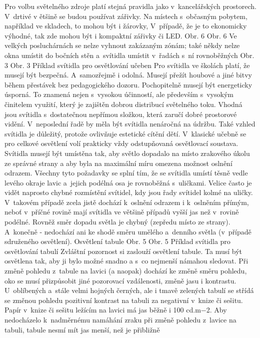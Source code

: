 Pro volbu světelného zdroje platí stejná pravidla jako v~kancelářských prostorech. V~drtivé v
ětšině se budou používat zářivky. Na místech s~občasným pobytem, například ve skladech, to mohou být
i žárovky, V~případě, že je to ekonomicky výhodné, tak zde mohou být i kompaktní zářivky či LED.
Obr. 6
Obr. 6 Ve velkých posluchárnách se nelze vyhnout zakázaným zónám; také někdy nelze okna umístit
do bočních stěn a~svítidla umístit v~řadách s~ní rovnoběžných
Obr. 3
Obr. 3 Příklad svítidla pro osvětlování učeben
\medskip
Pro svítidla ve školách platí, že musejí být bezpečná. A~samozřejmě i odolná. Musejí přežít houbové
a jiné bitvy během přestávek bez pedagogického dozoru. Pochopitelně musejí být energeticky úsporná.
To znamená nejen s~vysokou účinností, ale především s~vysokým činitelem využití, který je zajištěn
dobrou distribucí světelného toku. Vhodná jsou svítidla s~dostatečnou nepřímou složkou, která zaručí
dobré prostorové vidění. V~neposlední řadě by měla být svítidla nenáročná na údržbu.
Také vzhled svítidla je důležitý, protože ovlivňuje estetické cítění dětí.
\medskip
V~klasické učebně se pro celkové osvětlení volí prakticky vždy odstupňovaná osvětlovací soustava.
Svítidla musejí být umístěna tak, aby světlo dopadalo na místo zrakového úkolu ze správné strany
a aby byla na maximální míru omezena možnost oslnění odrazem. Všechny tyto požadavky se splní tím,
že se svítidla umístí těsně vedle levého okraje lavic a~jejich podélná osa je rovnoběžná s~uličkami.
Velice často je vidět naprosto chybné rozmístění svítidel, kdy jsou řady svítidel kolmé na uličky.
V~takovém případě zcela jistě dochází k~oslnění odrazem i k~oslněním přímým, neboť v~příčné rovině mají
svítidla ve většině případů vyšší jas než v~rovině podélné. Rovněž směr dopadu světla je chybný
(zepředu místo ze strany). A~konečně - nedochází ani ke shodě směru umělého a~denního světla (v~případě sdruženého osvětlení).
Osvětlení tabule
Obr. 5
Obr. 5 Příklad svítidla pro osvětlování tabulí
\medskip
Zvláštní pozornost si zaslouží osvětlení tabule. Ta musí být osvětlena tak, aby ji bylo možné snadno
a s~co nejmenší námahou sledovat. Při změně pohledu z~tabule na lavici (a naopak) dochází ke změně směru
pohledu, oko se musí přizpůsobit jiné pozorovací vzdálenosti, změně jasu i kontrastu. U~oblíbených a~stále
velmi hojných černých, ale i tmavě zelených tabulí se střídá se změnou pohledu pozitivní kontrast
na tabuli za negativní v~knize či sešitu.
\medskip
Papír v~knize či sešitu ležícím na lavici má jas běžně i 100 cd.m−2. Aby nedocházelo k~nadměrnému
namáhání zraku při změně pohledu z~lavice na tabuli, tabule nesmí mít jas menší, než je přibližně
